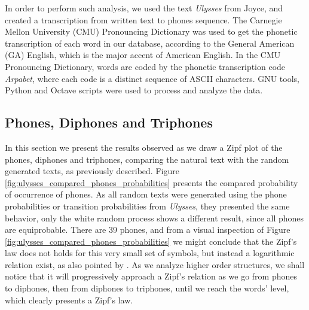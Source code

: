 In order to perform such analysis, we used the text \textit{Ulysses} from
Joyce, and created a transcription from written text to phones sequence. 
The Carnegie Mellon University (CMU) 
Pronouncing Dictionary \citep{cmu2008} was used to get the phonetic transcription of each word in our database,
according to the General American (GA) English, which is
the major accent of American English. 
In the CMU Pronouncing Dictionary, words are coded by the phonetic transcription code \textit{Arpabet},
where each code is a distinct sequence of ASCII characters.
GNU tools, Python and Octave scripts were used to process and analyze the data.


\subsection{Phones, Diphones and Triphones}
\label{sec:phones}
In this section we present the results observed as we draw a Zipf plot of the phones, diphones and
triphones, comparing the natural text with the random generated texts, as previously described.
Figure \ref{fig:ulysses_compared_phones_probabilities} presents the compared probability of occurrence
of phones. As all random texts were generated using the phone probabilities or
transition probabilities from \textit{Ulysses}, they presented the same behavior, only the
white random process shows a different result, since all phones are equiprobable.
There are 39 phones, and from a visual inspection of Figure \ref{fig:ulysses_compared_phones_probabilities}
we might conclude that the Zipf's law does not holds for this very small set of symbols,
but instead a logarithmic relation exist, as also pointed by \cite{kanter1995}.
As we analyze higher order structures, we shall notice that it will progressively approach 
a Zipf's relation as we go from phones to diphones, then from diphones to triphones, until
we reach the words' level, which clearly presents a Zipf's law.


